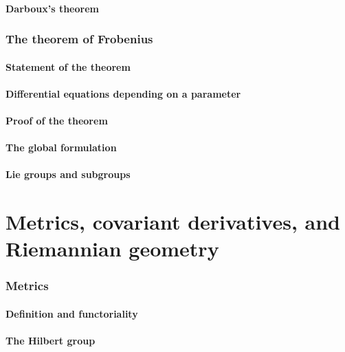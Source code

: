 \documentclass[a4paper]{article}
\begin{document}
\subsection{Darboux's theorem}

\section{The theorem of Frobenius}

\subsection{Statement of the theorem}

\subsection{Differential equations depending on a parameter}

\subsection{Proof of the theorem}

\subsection{The global formulation}

\subsection{Lie groups and subgroups}

\part{Metrics, covariant derivatives, and Riemannian geometry}

\section{Metrics}

\subsection{Definition and functoriality}

\subsection{The Hilbert group}
\end{document}
